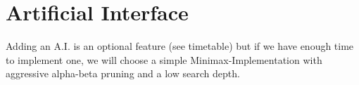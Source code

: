 \part{Artificial Interface}
Adding an A.I. is an optional feature (see timetable) but if we have enough time to implement one,
we will choose a simple Minimax-Implementation with aggressive alpha-beta pruning and a low search depth.
